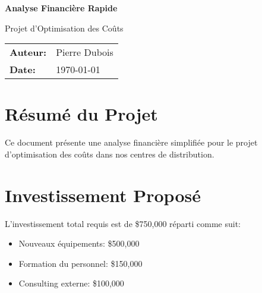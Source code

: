 




\begin{center}
\dollaramalogo[0.5]
\vspace{2cm}

{\Huge\bfseries\color{DollaramaGreen} Analyse Financière Rapide}
\vspace{1cm}

{\Large Projet d'Optimisation des Coûts}
\vspace{2cm}

\begin{tabular}{ll}
\textbf{Auteur:} & Pierre Dubois \\
\textbf{Date:} & \today
\end{tabular}
\end{center}

\clearpage

\section{Résumé du Projet}

Ce document présente une analyse financière simplifiée pour le projet d'optimisation des coûts dans nos centres de distribution.


\section{Investissement Proposé}

L'investissement total requis est de \$750,000 réparti comme suit:
\begin{itemize}
\item Nouveaux équipements: \$500,000
\item Formation du personnel: \$150,000
\item Consulting externe: \$100,000
\end{itemize}



